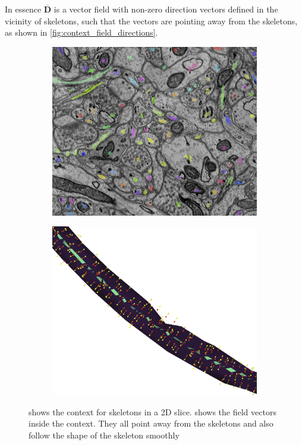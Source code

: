 In essence $\overline{\mathbf{D}}$ is a vector field with non-zero direction vectors defined in the vicinity of skeletons, such that the vectors are pointing away from the skeletons, as shown in \autoref{fig:context_field_directions}.

\begin{figure}[htpb]
	\newcommand{\mywidth}{0.45\textwidth}
	\centering
	\begin{subfigure}[b]{\mywidth}
		\centering
		\includegraphics[width=\textwidth]{data/images/contextField/context2D.png}
		\caption{\label{fig:context}}
	\end{subfigure}
	\hspace{3mm}
	\begin{subfigure}[b]{\mywidth}
		\centering
		\includegraphics[width=\textwidth]{data/images/contextField/directions_skel_context.png}
		\caption{\label{fig:directions_skel_ctx}}
	\end{subfigure}
		\caption{ shows the context for skeletons in a 2D slice.  shows the field vectors inside the context. They all point away from the skeletons and also follow the shape of the skeleton smoothly}
		\label{fig:context_field_directions}
\end{figure}
	
